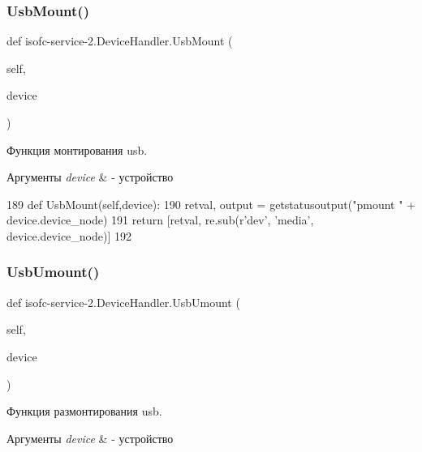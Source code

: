 \subsubsection{\texorpdfstring{Usb\+Mount()}{UsbMount()}}
{\footnotesize\ttfamily def isofc-\/service-\/2.Device\+Handler.\+Usb\+Mount (\begin{DoxyParamCaption}\item[{}]{self,  }\item[{}]{device }\end{DoxyParamCaption})}



Функция монтирования usb. 


\begin{DoxyParams}{Аргументы}
{\em device} & -\/ устройство \\
\hline
\end{DoxyParams}

\begin{DoxyCode}
189     \textcolor{keyword}{def }UsbMount(self,device):
190         retval, output = getstatusoutput(\textcolor{stringliteral}{"pmount "} + device.device\_node)
191         \textcolor{keywordflow}{return} [retval, re.sub(\textcolor{stringliteral}{r'dev'}, \textcolor{stringliteral}{'media'}, device.device\_node)]
192 
\end{DoxyCode}
\mbox{\label{classisofc-service-2_1_1DeviceHandler_a72e367f0aca59a59e9374c8bda9b8806}} 
\subsubsection{\texorpdfstring{Usb\+Umount()}{UsbUmount()}}
{\footnotesize\ttfamily def isofc-\/service-\/2.Device\+Handler.\+Usb\+Umount (\begin{DoxyParamCaption}\item[{}]{self,  }\item[{}]{device }\end{DoxyParamCaption})}



Функция размонтирования usb. 


\begin{DoxyParams}{Аргументы}
{\em device} & -\/ устройство \\
\hline
\end{DoxyParams}

